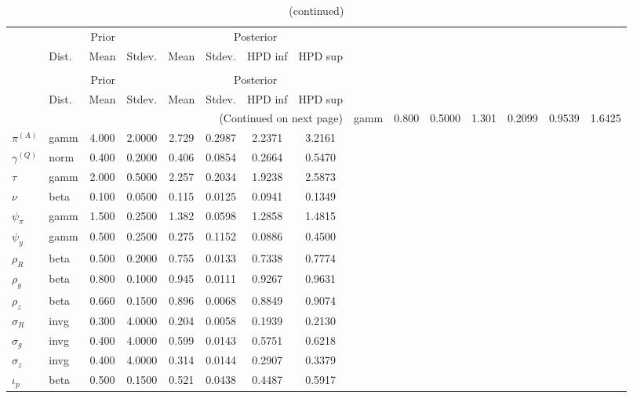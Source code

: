  
\begin{center}
\begin{longtable}{llcccccc} 
\caption{Results from Metropolis-Hastings (parameters)}
 \label{Table:MHPosterior:1}\\
\toprule 
  & \multicolumn{3}{c}{Prior}  &  \multicolumn{4}{c}{Posterior} \\
  \cmidrule(r{.75em}){2-4} \cmidrule(r{.75em}){5-8}
  & Dist. & Mean  & Stdev. & Mean & Stdev. & HPD inf & HPD sup\\
\midrule \endfirsthead 
\caption{(continued)}\\\toprule 
  & \multicolumn{3}{c}{Prior}  &  \multicolumn{4}{c}{Posterior} \\
  \cmidrule(r{.75em}){2-4} \cmidrule(r{.75em}){5-8}
  & Dist. & Mean  & Stdev. & Mean & Stdev. & HPD inf & HPD sup\\
\midrule \endhead 
\bottomrule \multicolumn{8}{r}{(Continued on next page)} \endfoot 
\bottomrule \endlastfoot 
${r_{A}}$ & gamm &   0.800 & 0.5000 &   1.301& 0.2099 &  0.9539 &  1.6425 \\ 
${\pi^{(A)}}$ & gamm &   4.000 & 2.0000 &   2.729& 0.2987 &  2.2371 &  3.2161 \\ 
${\gamma^{(Q)}}$ & norm &   0.400 & 0.2000 &   0.406& 0.0854 &  0.2664 &  0.5470 \\ 
${\tau}$ & gamm &   2.000 & 0.5000 &   2.257& 0.2034 &  1.9238 &  2.5873 \\ 
${\nu}$ & beta &   0.100 & 0.0500 &   0.115& 0.0125 &  0.0941 &  0.1349 \\ 
${\psi_\pi}$ & gamm &   1.500 & 0.2500 &   1.382& 0.0598 &  1.2858 &  1.4815 \\ 
${\psi_y}$ & gamm &   0.500 & 0.2500 &   0.275& 0.1152 &  0.0886 &  0.4500 \\ 
${\rho_R}$ & beta &   0.500 & 0.2000 &   0.755& 0.0133 &  0.7338 &  0.7774 \\ 
${\rho_{g}}$ & beta &   0.800 & 0.1000 &   0.945& 0.0111 &  0.9267 &  0.9631 \\ 
${\rho_z}$ & beta &   0.660 & 0.1500 &   0.896& 0.0068 &  0.8849 &  0.9074 \\ 
${\sigma_R}$ & invg &   0.300 & 4.0000 &   0.204& 0.0058 &  0.1939 &  0.2130 \\ 
${\sigma_{g}}$ & invg &   0.400 & 4.0000 &   0.599& 0.0143 &  0.5751 &  0.6218 \\ 
${\sigma_z}$ & invg &   0.400 & 4.0000 &   0.314& 0.0144 &  0.2907 &  0.3379 \\ 
${\iota_p}$ & beta &   0.500 & 0.1500 &   0.521& 0.0438 &  0.4487 &  0.5917 \\ 
\end{longtable}
 \end{center}
